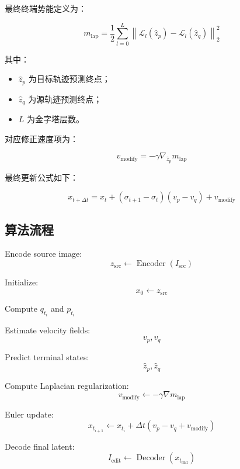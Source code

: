 \documentclass[11pt,a4paper]{ctexart}
\numberwithin{equation}{section}
\begin{document}
最终终端势能定义为：

\begin{equation}
m_{\text{lap}}
=
\frac{1}{2}
\sum_{l=0}^{L}
\left\|
\mathcal{L}_l(\hat{z}_p)
-
\mathcal{L}_l(\hat{z}_q)
\right\|_2^2
\end{equation}

其中：

\begin{itemize}
    \item $\hat{z}_p$ 为目标轨迹预测终点；
    \item $\hat{z}_q$ 为源轨迹预测终点；
    \item $L$ 为金字塔层数。
\end{itemize}

对应修正速度项为：

\begin{equation}
v_{\text{modify}}
=
-
\gamma
\nabla_{\hat{z}_p}
m_{\text{lap}}
\end{equation}

最终更新公式如下：

\begin{equation}
x_{t+\Delta t}
=
x_t
+
(\sigma_{t+1}-\sigma_t)
(v_p-v_q)
+
v_{\text{modify}}
\end{equation}

\subsection{算法流程}

\begin{algorithm}[t]
\caption{FlowLaplacianAlign}
\label{alg:flowlaplacian}
\begin{algorithmic}[1]

\State Encode source image:
\[
z_{\text{src}}
\leftarrow
\operatorname{Encoder}(I_{\text{src}})
\]

\State Initialize:
\[
x_0 \leftarrow z_{\text{src}}
\]


    \State Compute $q_{t_i}$ and $p_{t_i}$

    \State Estimate velocity fields:
    \[
    v_p, v_q
    \]

    \State Predict terminal states:
    \[
    \hat{z}_p,\hat{z}_q
    \]

    \State Compute Laplacian regularization:
    \[
    v_{\text{modify}}
    \leftarrow
    -
    \gamma
    \nabla m_{\text{lap}}
    \]

    \State Euler update:
    \[
    x_{t_{i+1}}
    \leftarrow
    x_{t_i}
    +
    \Delta t
    (v_p-v_q+v_{\text{modify}})
    \]

\EndFor

\State Decode final latent:
\[
I_{\text{edit}}
\leftarrow
\operatorname{Decoder}(x_{t_{\text{end}}})
\]

\end{algorithmic}
\end{algorithm}
\end{document}
